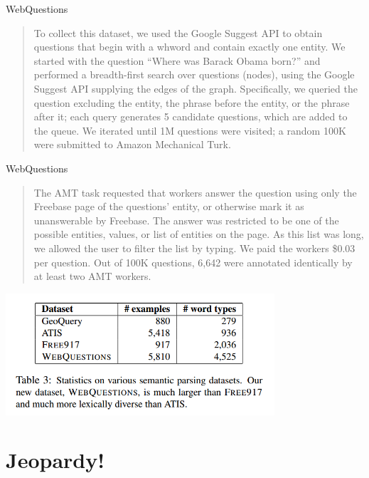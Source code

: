 \documentclass{beamer}
\begin{document}
\begin{frame}{WebQuestions}
  \begin{quote}
    To collect this dataset, we used the Google Suggest API to obtain
    questions that begin with a whword and contain exactly one
    entity. We started with the question “Where was Barack Obama
    born?”  and performed a breadth-first search over questions
    (nodes), using the Google Suggest API supplying the edges of the
    graph. Specifically, we queried the question excluding the entity,
    the phrase before the entity, or the phrase after it; each query
    generates 5 candidate questions, which are added to the queue.  We
    iterated until 1M questions were visited; a random 100K were
    submitted to Amazon Mechanical Turk.
  \end{quote}
\end{frame}

\begin{frame}{WebQuestions}
  \begin{quote}
    The AMT task requested that workers answer the question using only
    the Freebase page of the questions’ entity, or otherwise mark it
    as unanswerable by Freebase. The answer was restricted to be one
    of the possible entities, values, or list of entities on the
    page. As this list was long, we allowed the user to filter the
    list by typing. We paid the workers \$0.03 per question. Out of
    100K questions, 6,642 were annotated identically by at least two
    AMT workers.
  \end{quote}
\end{frame}

\begin{frame}
  \begin{center}
    \includegraphics[width=10cm]{webquestions}
  \end{center}
\end{frame}

\section{Jeopardy!}
\end{document}
